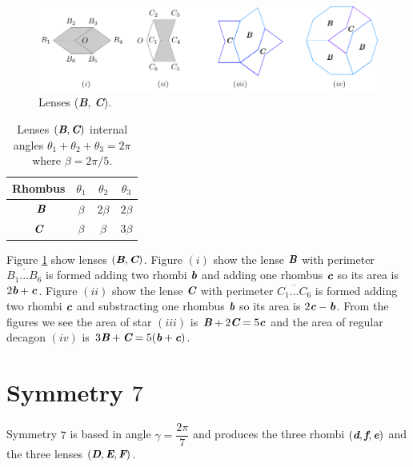 \documentclass[11pt]{article}
\def\mathbi#1{\textbf{\em #1}}
\begin{document}
\begin{figure}[H]
\centering
\includegraphics[scale=1.1]{bc/hexagons}
\caption{Lenses (\mathbi{B}, \mathbi{C}).}
\label{fig:bc-hexagons}
\end{figure}

\begin{table}[H]
\begin{center}
\begin{tabular}{|c|c c c|}
\hline
Rhombus & $\theta_1$ & $\theta_2$ & $\theta_3$ \\ %
\hline\
$\mathbi{B}$ & $\beta$ & $2\beta$ & $2\beta$ \\[0.5ex] \hline
$\mathbi{C}$ & $\beta$ & $\beta$ & $3\beta$ \\[0.5ex] \hline
\end{tabular}
\caption{Lenses $(\mathbi{B},\mathbi{C})$ internal angles $\theta_1+\theta_2+\theta_3 = 2\pi$ where $\beta = 2\pi/5$.} 
\label{tbl:bc-lenses-angles}
\end{center}
\end{table}


Figure \ref{fig:bc-hexagons} show lenses $(\mathbi{B},\mathbi{C})$.
Figure $(i)$ show the lense $\mathbi{B}$ with perimeter $\overline{B_1...B_6}$ is formed adding two rhombi $\mathbi{b}$ and adding one rhombus $\mathbi{c}$ so its area is $2\mathbi{b} + \mathbi{c}$.
Figure $(ii)$ show the lense $\mathbi{C}$ with perimeter $\overline{C_1...C_6}$ is formed adding two rhombi $\mathbi{c}$ and substracting one rhombus $\mathbi{b}$ so its area is $2\mathbi{c} - \mathbi{b}$.
From the figures we see the area of star $(iii)$ is $\mathbi{B} + 2\mathbi{C} = 5\mathbi{c}$
and the area of regular decagon $(iv)$ is $3\mathbi{B} + \mathbi{C} = 5(\mathbi{b} + \mathbi{c})$.

\section{Symmetry $7$}

Symmetry $7$ is based in angle $\gamma = \dfrac{2\pi}7$ and produces the three rhombi $(\mathbi{d},\mathbi{f},\mathbi{e})$ and the three lenses $(\mathbi{D},\mathbi{E},\mathbi{F})$.
\end{document}
